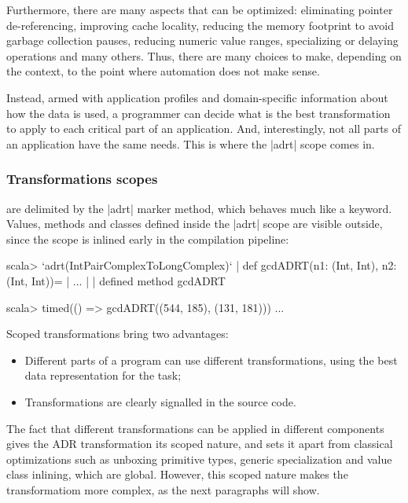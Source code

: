 Furthermore, there are many aspects that can be optimized: eliminating pointer de-referencing, improving cache locality, reducing the memory footprint to avoid garbage collection pauses, reducing numeric value ranges, specializing or delaying operations and many others. Thus, there are many choices to make, depending on the context, to the point where automation does not make sense.

Instead, armed with application profiles and domain-specific information about how the data is used, a programmer can decide what is the best transformation to apply to each critical part of an application. And, interestingly, not all parts of an application have the same needs. This is where the |adrt| scope comes in.

\subsubsection{Transformations scopes} are delimited by the |adrt| marker method, which behaves much like a keyword. Values, methods and classes defined inside the |adrt| scope are visible outside, since the scope is inlined early in the compilation pipeline:

\begin{lstlisting-nobreak}
scala> `adrt(IntPairComplexToLongComplex)` {
       |   def gcdADRT(n1: (Int, Int), n2: (Int, Int))={
       |     ...
       |   }
       | }
defined method gcdADRT
\end{lstlisting-nobreak}


\begin{lstlisting-nobreak}
scala> timed(() => gcdADRT((544, 185), (131, 181)))
...
\end{lstlisting-nobreak}

Scoped transformations bring two advantages:

\begin{itemize}
 \item Different parts of a program can use different transformations, using the best data representation for the task;
 \item Transformations are clearly signalled in the source code.
\end{itemize}

The fact that different transformations can be applied in different components gives the ADR transformation its scoped nature, and sets it apart from classical optimizations such as unboxing primitive types, generic specialization and value class inlining, which are global. However, this scoped nature makes the transformatiom more complex, as the next paragraphs will show.

